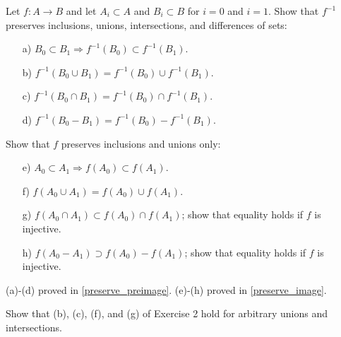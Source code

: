   \begin{exercise}[Munkres 2.2]
    Let $f: A \to B$ and let $A_i \subset A$ and $B_i \subset B$ for $i = 0$ and $i = 1$. Show that $f^{-1}$ preserves inclusions, unions, intersections, and differences of sets:
    \begin{enumerate}
      \item[a)] $B_0 \subset B_1 \Rightarrow f^{-1}(B_0) \subset f^{-1}(B_1)$.
      \item[b)] $f^{-1}(B_0 \cup B_1) = f^{-1}(B_0) \cup f^{-1}(B_1)$.
      \item[c)] $f^{-1}(B_0 \cap B_1) = f^{-1}(B_0) \cap f^{-1}(B_1)$.
      \item[d)] $f^{-1}(B_0 - B_1) = f^{-1}(B_0) - f^{-1}(B_1)$.
    \end{enumerate}
    Show that $f$ preserves inclusions and unions only:
    \begin{enumerate}[resume]
      \item[e)] $A_0 \subset A_1 \Rightarrow f(A_0) \subset f(A_1)$.
      \item[f)] $f(A_0 \cup A_1) = f(A_0) \cup f(A_1)$.
      \item[g)] $f(A_0 \cap A_1) \subset f(A_0) \cap f(A_1)$; show that equality holds if $f$ is injective.
      \item[h)] $f(A_0 - A_1) \supset f(A_0) - f(A_1)$; show that equality holds if $f$ is injective.
    \end{enumerate}
  \end{exercise}
  \begin{solution}
     (a)-(d) proved in \ref{preserve_preimage}. (e)-(h) proved in \ref{preserve_image}.  
  \end{solution}

  \begin{exercise}[Munkres 2.3]
    Show that (b), (c), (f), and (g) of Exercise 2 hold for arbitrary unions and intersections.
  \end{exercise}
  \begin{solution}
    
  \end{solution}

